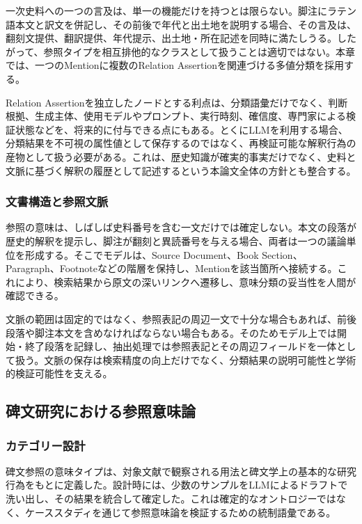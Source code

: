 一次史料への一つの言及は、単一の機能だけを持つとは限らない。脚注にラテン語本文と訳文を併記し、その前後で年代と出土地を説明する場合、その言及は、翻刻文提供、翻訳提供、年代提示、出土地・所在記述を同時に満たしうる。したがって、参照タイプを相互排他的なクラスとして扱うことは適切ではない。本章では、一つのMentionに複数のRelation Assertionを関連づける多値分類を採用する。

Relation Assertionを独立したノードとする利点は、分類語彙だけでなく、判断根拠、生成主体、使用モデルやプロンプト、実行時刻、確信度、専門家による検証状態などを、将来的に付与できる点にもある。とくにLLMを利用する場合、分類結果を不可視の属性値として保存するのではなく、再検証可能な解釈行為の産物として扱う必要がある。これは、歴史知識が確実的事実だけでなく、史料と文脈に基づく解釈の履歴として記述するという本論文全体の方針とも整合する。

\subsubsection{文書構造と参照文脈}

参照の意味は、しばしば史料番号を含む一文だけでは確定しない。本文の段落が歴史的解釈を提示し、脚注が翻刻と異読番号を与える場合、両者は一つの議論単位を形成する。そこでモデルは、Source Document、Book Section、Paragraph、Footnoteなどの階層を保持し、Mentionを該当箇所へ接続する。これにより、検索結果から原文の深いリンクへ遷移し、意味分類の妥当性を人間が確認できる。

文脈の範囲は固定的ではなく、参照表記の周辺一文で十分な場合もあれば、前後段落や脚注本文を含めなければならない場合もある。そのためモデル上では開始・終了段落を記録し、抽出処理では参照表記とその周辺フィールドを一体として扱う。文脈の保存は検索精度の向上だけでなく、分類結果の説明可能性と学術的検証可能性を支える。

\subsection{碑文研究における参照意味論}

\subsubsection{カテゴリー設計}

碑文参照の意味タイプは、対象文献で観察される用法と碑文学上の基本的な研究行為をもとに定義した。設計時には、少数のサンプルをLLMによるドラフトで洗い出し、その結果を統合して確定した。これは確定的なオントロジーではなく、ケーススタディを通じて参照意味論を検証するための統制語彙である。

